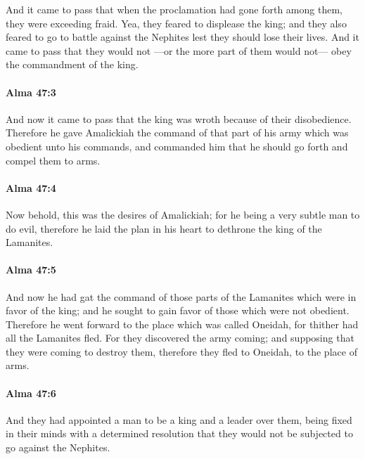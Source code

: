 			And it came to pass that
			when the proclamation had gone forth among them,
			they were exceeding fraid.
			Yea, they feared to displease the king;
			and they also feared to go to battle against the Nephites
			lest they should lose their lives.
			And it came to pass that they would not
			---or the more part of them would not---
			obey the commandment of the king.

		\paragraph{Alma 47:3} %
			\label{ALMA-47-3}

			And now it came to pass that
			the king was wroth because of their disobedience.
			Therefore he gave Amalickiah the command of that part of his army
			which was obedient unto his commands,
			and commanded him that he should go forth and compel them to arms.

		\paragraph{Alma 47:4} %
			\label{ALMA-47-4}

			Now behold, this was the desires of Amalickiah;
			for he being a very subtle man to do evil,
			therefore he laid the plan in his heart to dethrone the king of the Lamanites.

		\paragraph{Alma 47:5} %
			\label{ALMA-47-5}

			And now he had gat the command of those parts of the Lamanites
			which were in favor of the king;
			and he sought to gain favor of those which were not obedient.
			Therefore he went forward to the place which was called Oneidah,
			for thither had all the Lamanites fled.
			For they discovered the army coming;
			and supposing that they were coming to destroy them,
			therefore they fled to Oneidah, to the place of arms.

		\paragraph{Alma 47:6} %
			\label{ALMA-47-6}

			And they had appointed a man to be a king and a leader over them,
			being fixed in their minds with a determined resolution
			that they would not be subjected to go against the Nephites.

